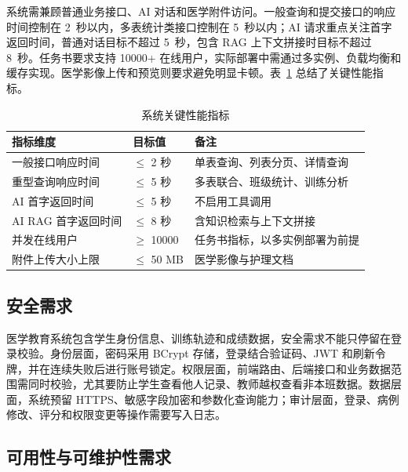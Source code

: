 系统需兼顾普通业务接口、AI 对话和医学附件访问。一般查询和提交接口的响应时间控制在 2~秒以内，多表统计类接口控制在 5~秒以内；AI 请求重点关注首字返回时间，普通对话目标不超过 5~秒，包含 RAG 上下文拼接时目标不超过 8~秒。任务书要求支持 10000+ 在线用户，实际部署中需通过多实例、负载均衡和缓存实现。医学影像上传和预览则要求避免明显卡顿。表~\ref{tab:perf} 总结了关键性能指标。

\begin{table}[H]
    \centering
    \caption{系统关键性能指标}
    \label{tab:perf}
    \begin{tabular}{l l p{6cm}}
        \toprule
        指标维度 & 目标值 & 备注 \\
        \midrule
        一般接口响应时间 & $\le$ 2 秒 & 单表查询、列表分页、详情查询 \\
        重型查询响应时间 & $\le$ 5 秒 & 多表联合、班级统计、训练分析 \\
        AI 首字返回时间 & $\le$ 5 秒 & 不启用工具调用 \\
        AI RAG 首字返回时间 & $\le$ 8 秒 & 含知识检索与上下文拼接 \\
        并发在线用户 & $\ge$ 10000 & 任务书指标，以多实例部署为前提 \\
        附件上传大小上限 & $\le$ 50 MB & 医学影像与护理文档 \\
        \bottomrule
    \end{tabular}
\end{table}

\subsection{安全需求}

医学教育系统包含学生身份信息、训练轨迹和成绩数据，安全需求不能只停留在登录校验。身份层面，密码采用 BCrypt 存储，登录结合验证码、JWT 和刷新令牌，并在连续失败后进行账号锁定。权限层面，前端路由、后端接口和业务数据范围需同时校验，尤其要防止学生查看他人记录、教师越权查看非本班数据。数据层面，系统预留 HTTPS、敏感字段加密和参数化查询能力；审计层面，登录、病例修改、评分和权限变更等操作需要写入日志。

\subsection{可用性与可维护性需求}

